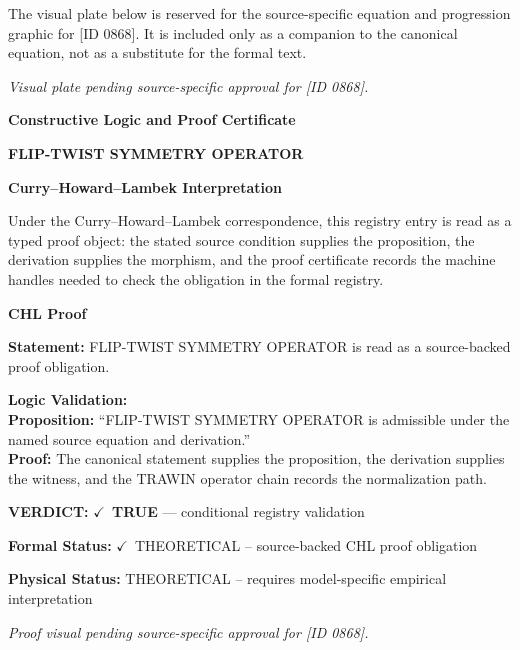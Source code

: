 \begingroup\footnotesize\sloppy
The visual plate below is reserved for the source-specific equation and progression graphic for [ID 0868]. It is included only as a companion to the canonical equation, not as a substitute for the formal text.
\par\endgroup
\begingroup\footnotesize\itshape
Visual plate pending source-specific approval for [ID 0868].
\par\endgroup

\clearpage
\begingroup\tzpsupportsetup
\noindent\textbf{\fontsize{10.8pt}{12.8pt}\selectfont [ID 0868] Constructive Logic and Proof Certificate}\par
\noindent\textbf{\fontsize{10pt}{12pt}\selectfont FLIP-TWIST SYMMETRY OPERATOR}\par
\vspace{0.45em}
\begingroup
\footnotesize
\setlength{\parskip}{0.22em}
\setlength{\parindent}{0pt}
\noindent\textbf{Curry--Howard--Lambek Interpretation}\par
Under the Curry--Howard--Lambek correspondence, this registry entry is read as a typed proof
object: the stated source condition supplies the proposition, the derivation supplies the
morphism, and the proof certificate records the machine handles needed to check the obligation
in the formal registry.

\vspace{0.45em}
\noindent\textbf{CHL Proof}\par
\textbf{Statement:} FLIP-TWIST SYMMETRY OPERATOR is read as a source-backed proof obligation.

\textbf{Logic Validation:}\\
\textbf{Proposition:} ``FLIP-TWIST SYMMETRY OPERATOR is admissible under the named source equation and derivation.''\\
\textbf{Proof:} The canonical statement supplies the proposition, the derivation supplies the witness, and the TRAWIN operator chain records the normalization path.

\textbf{VERDICT:} \ensuremath{\checkmark}\ \textbf{TRUE} --- conditional registry validation

\textbf{Formal Status:} \ensuremath{\checkmark}\ THEORETICAL -- source-backed CHL proof obligation

\textbf{Physical Status:} THEORETICAL -- requires model-specific empirical interpretation
\par\vspace{0.45em}
\par
\vfill
\begingroup\footnotesize\itshape
Proof visual pending source-specific approval for [ID 0868].
\par\endgroup
\vfill
\endgroup
\endgroup
